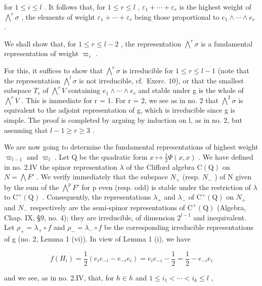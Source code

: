 for \(1 \leq i \leq l\) . It follows that, for \(1 \leq r \leq l\) , \(\varepsilon_{1} + \cdots + \varepsilon_{r}\) is the highest weight of \(\bigwedge^{r} \sigma\) , the elements of weight \(\varepsilon_{1} + \cdots + \varepsilon_{r}\) being those proportional to \(e_{1} \wedge \cdots \wedge e_{r}\) .

We shall show that, for \(1 \leq r \leq l - 2\) , the representation \(\bigwedge^{r} \sigma\) is a fundamental representation of weight \(\varpi_{r}\) .

For this, it suffices to show that \(\bigwedge^{r}\sigma\) is irreducible for \(1 \leq r \leq l - 1\) (note that the representation \(\bigwedge^{l}\sigma\) is not irreducible, cf.~Exerc. 10), or that the smallest subspace \(T_{r}\) of \(\bigwedge^{r}V\) containing \(e_{1} \wedge \cdots \wedge e_{r}\) and stable under g is the whole of \(\bigwedge^{r}V\) . This is immediate for r = 1. For r = 2, we see as in no. 2 that \(\bigwedge^{2}\sigma\) is equivalent to the adjoint representation of g, which is irreducible since g is simple. The proof is completed by arguing by induction on l, as in no. 2, but assuming that \(l - 1 \geq r \geq 3\) .

We are now going to determine the fundamental representations of highest weight \(\varpi_{l-1}\) and \(\varpi_{l}\) . Let Q be the quadratic form \(x \mapsto \frac{1}{2}\Psi(x, x)\) . We have defined in no. 2.IV the spinor representation \(\lambda\) of the Clifford algebra \(\mathrm{C}(\mathrm{Q})\) on \(N = \bigwedge F'\) . We verify immediately that the subspace \(N_{+}\) (resp. \(N_{-}\) ) of N given by the sum of the \(\bigwedge^{p}F'\) for p even (resp. odd) is stable under the restriction of \(\lambda\) to \(\mathrm{C}^{+}(\mathrm{Q})\) . Consequently, the representations \(\lambda_{+}\) and \(\lambda_{-}\) of \(\mathrm{C}^{+}(\mathrm{Q})\) on \(N_{+}\) and \(N_{-}\) respectively are the semi-spinor representations of \(\mathrm{C}^{+}(\mathrm{Q})\) (Algebra, Chap. IX, §9, no. 4); they are irreducible, of dimension \(2^{l-1}\) and inequivalent. Let \(\rho_{+} = \lambda_{+} \circ f\) and \(\rho_{-} = \lambda_{-} \circ f\) be the corresponding irreducible representations of g (no. 2, Lemma 1 (vi)). In view of Lemma 1 (i), we have

\[
f (H _ {i}) = \frac {1}{2} (e _ {i} e _ {- i} - e _ {- i} e _ {i}) = e _ {i} e _ {- i} - \frac {1}{2} = \frac {1}{2} - e _ {- i} e _ {i}
\]

and we see, as in no. 2.IV, that, for \(h \in h\) and \(1 \leq i_{1} < \cdots < i_{k} \leq l\) ,

